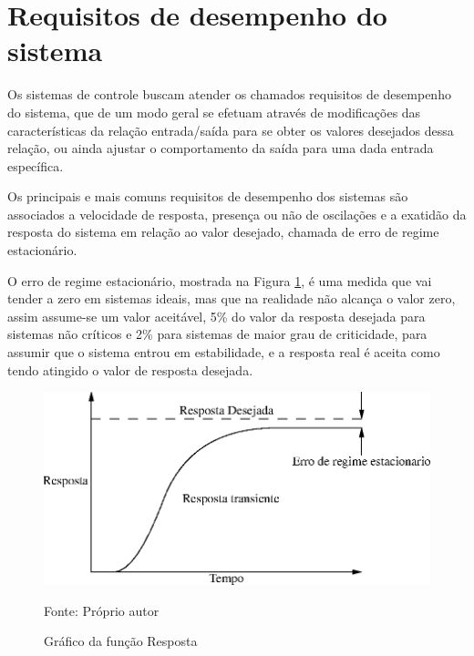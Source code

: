 



\section{Requisitos de desempenho do sistema}

Os sistemas de controle buscam atender os chamados requisitos de desempenho do sistema, que de um modo geral se efetuam através de modificações das características da relação entrada/saída para se obter os valores desejados dessa relação, ou ainda ajustar o comportamento da saída para uma dada entrada específica.

Os principais e mais comuns requisitos de desempenho dos sistemas são associados a velocidade de resposta, presença ou não de oscilações e a exatidão da resposta do sistema em relação ao valor desejado, chamada de erro de regime estacionário.

O erro de regime estacionário, mostrada na Figura \ref{fig:funcaoResposta}, é uma medida que vai tender a zero em sistemas ideais, mas que na realidade não alcança o valor zero, assim assume-se um valor aceitável, 5\% do valor da resposta desejada para sistemas não críticos e 2\% para sistemas de maior grau de criticidade, para assumir que o sistema entrou em estabilidade, e a resposta real é aceita como tendo atingido o valor de resposta desejada. 

\begin{figure}[!htb]
\centering
\caption{Gráfico da função Resposta}
\center\includegraphics[scale=1]{./imagens/C400grafico.eps}
\label{fig:funcaoResposta}

{\small Fonte: Próprio autor}
\end{figure}

